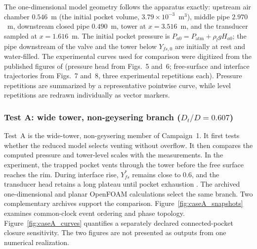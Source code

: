 The one-dimensional model geometry follows the apparatus exactly: upstream
air chamber $0.546$~m (the initial pocket volume,
$3.79\times10^{-3}$~m$^3$), middle pipe $2.970$~m, downstream closed pipe
$0.490$~m, tower at $x=3.516$~m, and the transducer sampled at $x=1.616$~m.
The initial pocket pressure is
$P_{a0}=P_{\mathrm{atm}}+\rho_l g H_{a0}$; the pipe downstream of the valve
and the tower below $Y_{fs,0}$ are initially at rest and water-filled. The
experimental curves used for comparison were digitized from the published
figures of \cite{vasconcelos2011} (pressure head from Figs.~5 and~6;
free-surface and interface trajectories from Figs.~7 and~8, three
experimental repetitions each). Pressure repetitions are summarized by a
representative pointwise curve, while level repetitions are redrawn
individually as vector markers.

\subsubsection{Test A: wide tower, non-geysering branch
($D_t/D=0.607$)}
\label{sec:tests:vw2011:caseA}

Test~A is the wide-tower, non-geysering member of Campaign~1. It first tests
whether the reduced model selects venting without overflow. It then compares
the computed pressure and tower-level scales with the measurements. In the
experiment, the trapped pocket vents through the tower before the free surface
reaches the rim. During interface rise, $Y^{*}_{fs}$ remains close to 0.6, and
the transducer head retains a long plateau until pocket exhaustion
\citep{vasconcelos2011}. The archived one-dimensional and planar OpenFOAM
calculations select the same branch. Two complementary archives support the
comparison. Figure~\ref{fig:caseA_snapshots} examines common-clock event
ordering and phase topology. Figure~\ref{fig:caseA_curves} quantifies a
separately declared connected-pocket closure sensitivity. The two figures are
not presented as outputs from one numerical realization.

